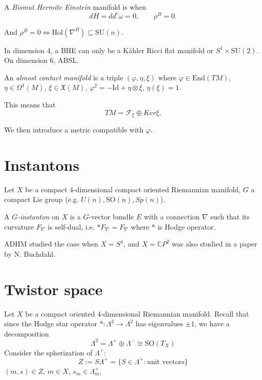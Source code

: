 \documentclass{book}
\begin{document}
\begin{definition}
\label{definition-bismut-hermite-einstein}
A {\it Bismut Hermite Einstein} manifold
is when
$$
dH=d d^c\omega=0,\qquad
\rho^B=0.
$$
\end{definition}

\noindent
And $\rho^B=0 \iff \text{Hol}(\nabla^B)
\subseteq \text{SU}(n)$.

\medskip\noindent
In dimension 4, a BHE
can only be a Kähler Ricci flat manifold
or $S^1 \times \text{SU}(2)$. On
dimension 6, ABSL.

\begin{definition}
\label{definition-almost-contact}
An {\it almost contact manifold}
is a triple $(\varphi,\eta,\xi)$
where $\varphi \in \text{End}(TM)$,
$\eta \in \Omega^1(M)$,
$\xi \in \mathfrak{X}(M)$,
$\varphi^2 = -\text{Id} + \eta \otimes \xi$,
$\eta(\xi)=1$.
\end{definition}

\noindent
This means that
$$
TM = \mathcal{F}_{\xi}\oplus Ker\xi.
$$

We then introduce a metric
compatible with $\varphi$.




\section{Instantons}
\label{section-instantons}

\noindent
Let $X$ be a compact 4-dimensional compact
oriented Riemannian manifold, $G$ a compact
Lie group (e.g. $U(n), \text{SO}(n),Sp(n)$).

\begin{definition}
\label{definition-g-instanton}
A {\it $G$-instanton} on $X$
is a $G$-vector bundle $E$
with a connection $\nabla$ such that its
curvature $F_{\nabla}$ is self-dual, i.e.
$*F_{\nabla}=F_{\nabla}$
where $*$ is Hodge operator.
\end{definition}

ADHM studied the case when $X=S^4$,
and $X=\mathbb{C}P^2$ was also studied in a
paper by N. Buchdahl.

\section{Twistor space}
\label{section-twistor-space}

\noindent

Let $X$ be a compact oriented 4-dimensional
Riemannian manifold. Recall that since the
Hodge star operator $*:\Lambda^2\to\Lambda^2$
has eigenvalues $\pm 1$, we have a
decomposition
$$
\Lambda^2=\Lambda^+ \oplus \Lambda^- \cong
\text{SO}(T_X)
$$
Consider the spherization of $\Lambda^+$:
$$
Z:=S\Lambda^+=\{S \in \Lambda^+:\text{unit
vectors}\}
$$
$(m,s) \in Z$, $m \in X$, $s_m \in
\Lambda^+_m$,
\end{document}
